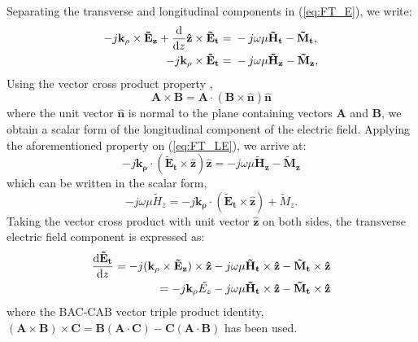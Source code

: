 \documentclass[11pt]{article}
\renewcommand{\v}[1]{\mathbf{#1}} %
\newcommand{\ti}[1]{\tilde{#1}} %
\renewcommand{\O}{\omega}  %
\renewcommand{\u}{\mu}  %
\newcommand{\p}{\rho}  %
\newcommand{\x}{\times}  %
\renewcommand{\^}{\hat}  %
\begin{document}
  Separating the transverse and longitudinal components in (\ref{eq:FT_E}), we write:
  \begin{subequations}
    \begin{align}
      -j\v{k_{\p}} \x \v{\ti{E}_z} +
      \dv{}{z}\v{\^{z}} \x \v{\ti{E}_t} ={}&
      -j \O \u \v{\ti{H}_t} -
      \v{\ti{M}_t},
      \label{eq:FT_TE}\\
      -j\v{k_{\p}} \x \v{\ti{E}_t} ={}&
      -j \O \u \v{\ti{H}_z} -
      \v{\ti{M}_z},
      \label{eq:FT_LE}
    \end{align}
    \label{eq:FT_TLE}
  \end{subequations}
  Using the vector cross product property \cite[p. 117]{fang2009antenna},
  \begin{equation}
    \v{A}\x\v{B} =\v{A}\cdot (\v{B} \x \v{\^{n}})\v{\^{n}}
    \label{eq:vec}
  \end{equation}
  where the unit vector $\v{\^{n}}$ is normal to the plane containing vectors $\v{A}$ and $\v{B}$, we obtain a scalar form of the longitudinal component of the electric field. Applying the aforementioned property on (\ref{eq:FT_LE}), we arrive at:
  \begin{equation}
    -j \v{k_{\p}} \cdot (\v{\ti{E}_t} \x \v{\^{z}})\v{\^{z}} =
    -j \O \u \v{\ti{H}_z} - \v{\ti{M}_z}
    \label{eq:FT_sLE}
  \end{equation}
  which can be written in the scalar form,
  \begin{equation}
    -j \O \u \ti{H}_z =
    -j \v{k_{\p}} \cdot (\v{\ti{E}_t} \x \v{\^{z}}) + {\ti{M}_z}.
    \label{eq:sLH}
  \end{equation}
  Taking the vector cross product with unit vector $\v{\^{z}}$ on both sides, the transverse electric field component is expressed as:
  \begin{equation}
    \begin{split}
      \dv{\v{\ti{E}_t}}{z} = -j (\v{k_{\p}} \x \v{\ti{E}_z}) \x \v{\^{z}}
      -j \O \u \v{\ti{H}_t} \x \v{\^{z}}  -
      \v{\ti{M}_t} \x \v{\^{z}} \\
      = -j \v{k_{\p}} \ti{{E}_z} -j \O \u \v{\ti{H}_t} \x \v{\^{z}}  -
      \v{\ti{M}_t} \x \v{\^{z}}
    \end{split}
    \label{eq:dFT_ET}
  \end{equation}
  where the BAC-CAB vector triple product identity, $(\v{A} \x \v{B})\x\v{C} = \v{B}(\v{A} \cdot \v{C}) - \v{C}(\v{A} \cdot \v{B})$ has been used.
\end{document}
